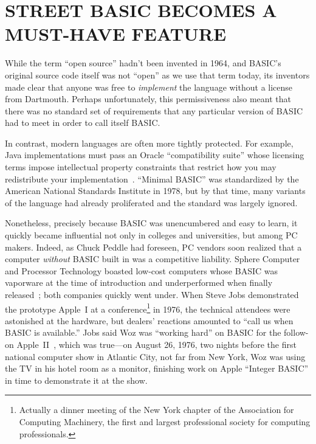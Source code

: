 
\section{STREET BASIC BECOMES A MUST-HAVE FEATURE}


While the term ``open source'' hadn't been invented in 1964, and BASIC's
original source code itself was not ``open'' as we use that term today, its
inventors made clear that anyone was free to \emph{implement} the language
without a license from Dartmouth.
Perhaps unfortunately, this permissiveness also meant that there was
no standard set of requirements that any particular version of BASIC
had to meet in order to call itself BASIC.


\begin{tangent}{}
In contrast, modern languages are often more tightly protected.
For example, Java implementations must pass an Oracle ``compatibility
suite'' whose licensing terms impose intellectual property constraints
that restrict how you may redistribute your
implementation~\cite{apache-java-letter,apache-resigns-jcp}.
 ``Minimal BASIC'' was standardized by the American
National Standards Institute in 1978, but by that time, many variants
of the language had already proliferated and the standard was largely ignored.
\end{tangent}

Nonetheless, precisely because BASIC was unencumbered and easy to learn, it quickly became
influential not only in colleges and universities, but among PC
makers.
Indeed, as Chuck Peddle had foreseen, PC vendors soon realized that a
computer \emph{without} BASIC built in was a competitive liability.
Sphere Computer and Processor Technology boasted low-cost computers
whose BASIC was vaporware at the time of introduction and
underperformed when finally released~\cite[p. 114, 134]{veit}; both
companies quickly went under.
When Steve Jobs demonstrated the prototype Apple~I at a
conference\footnote{Actually a dinner meeting of the New York chapter
of the Association for Computing Machinery, the first and largest
professional society for computing professionals.} in
1976, the technical attendees were astonished at the hardware, but
dealers' reactions amounted to ``call us when BASIC is available.''
Jobs said Woz was ``working hard'' on BASIC for the follow-on
Apple~II~\cite[pp. 92ff]{veit}, which was true---on August 26, 1976,
two nights before the first national computer show in Atlantic City,
not far from New York, Woz was using the TV in  his hotel room as a
monitor,  finishing work on Apple
``Integer BASIC'' in time to demonstrate it at the show.

